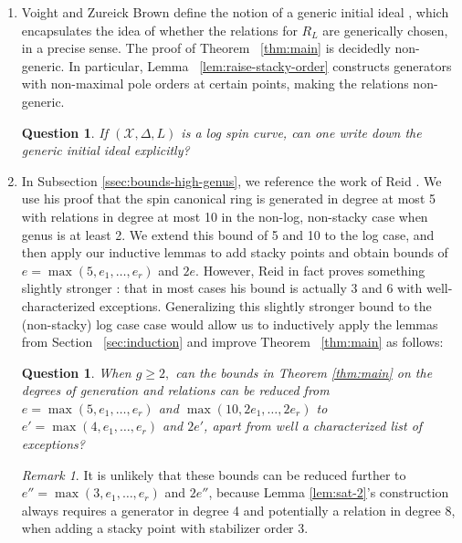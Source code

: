 \documentclass{amsart}
\theoremstyle{plain}
\newtheorem{question}[thm]{Question}
\theoremstyle{definition}
\theoremstyle{remark}
\newtheorem{rem}[thm]{Remark}
\numberwithin{equation}{section}
\newcommand\sx{\mathscr X}
\newcommand{\halfcan}{L}
\begin{document}
\begin{enumerate}
	\item Voight and Zureick Brown define
		the notion of a generic initial ideal \cite[Definition 2.2.7]{vzb:stacky}, which 
		encapsulates the idea of whether the relations for $R_\halfcan$ are 
		generically chosen, in a precise sense. 
		The proof of Theorem
		~\ref{thm:main} is decidedly non-generic. 
		In particular, Lemma ~\ref{lem:raise-stacky-order} 
		constructs generators with non-maximal pole orders at certain 
		points, making the relations non-generic. 
		\begin{question}
		\label{ques:generic-initial}
			If $(\sx, \Delta, \halfcan)$ is a log spin curve, can one write down the
			generic initial ideal explicitly?
		\end{question}
	\item In Subsection \ref{ssec:bounds-high-genus}, we reference 
		the work of Reid \cite[Theorem 3.4]{reid:infinitesimal}. We use his 
		proof that the 
		spin canonical ring is generated in degree at most 5 with
		relations in degree at most 10 in the 			
		non-log, non-stacky case when genus is at least 2. We extend this 
		bound of 5 and 10 to the log case, and then apply our inductive 
		lemmas to add stacky points and obtain bounds of $e = \max(5,e_1, \ldots, e_r)$ and $2e$.  However, Reid in fact proves something slightly stronger \cite[Theorem 3.4]{reid:infinitesimal}: that in 
		most cases his bound is actually 3 and 6 with well-characterized 
		exceptions.
		Generalizing this slightly stronger bound to the (non-stacky) log case case would allow us to inductively apply the lemmas from Section ~\ref{sec:induction} and improve Theorem ~\ref{thm:main} as follows:
		\begin{question}\label{ques:reduce-5,10-to-4,8}
			When $g \geq 2,$ can the bounds in Theorem \ref{thm:main} on 
			the degrees of generation and relations can be reduced from 
			$e = \max(5,e_1, \ldots, e_r)$ and $\max(10, 2e_1, \ldots, 2e_r)$ to 
			$e'=\max(4,e_1, \ldots, e_r)$ and $2e'$, 
			apart from well a characterized list of exceptions?
		\end{question}
		\begin{rem}\label{rem:reduce-3,6}
			It is unlikely that these bounds can be reduced further to 
			$e''=\max(3, e_1, \ldots, e_r)$ and $2e''$, 
			because Lemma \ref{lem:sat-2}'s construction always
			requires a generator in degree 4 and potentially a relation in 
			degree 8, when adding a stacky point with stabilizer order 3. 

\end{rem}
\end{enumerate}
\end{document}
